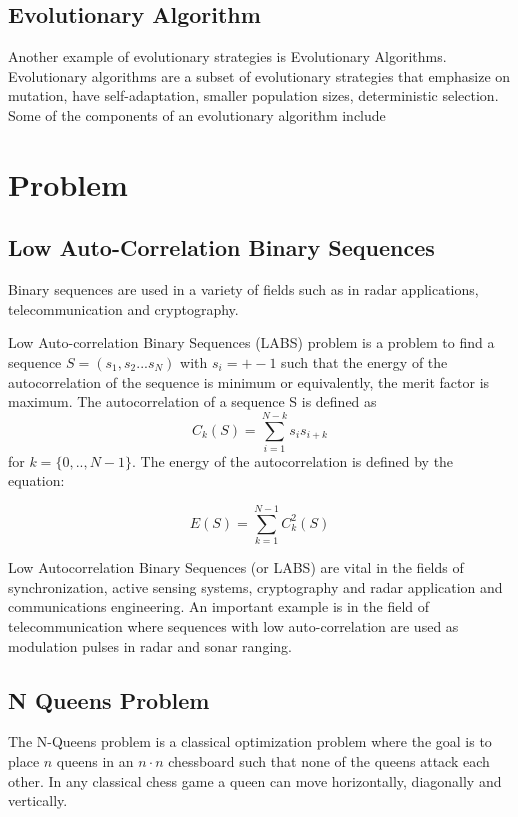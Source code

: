 \documentclass{article}
\begin{document}
\subsection{Evolutionary Algorithm}
Another example of evolutionary strategies is Evolutionary Algorithms. Evolutionary algorithms are a subset of evolutionary strategies that emphasize on mutation, have self-adaptation, smaller population sizes, deterministic selection. \\
Some of the components of an evolutionary algorithm include

\section{Problem}
\subsection{Low Auto-Correlation Binary Sequences}\label{sec:labs}
Binary sequences are used in a variety of fields such as in radar applications, telecommunication and cryptography. 

Low Auto-correlation Binary Sequences (LABS) problem is a problem to find a sequence $S = (s_1, s_2 ... s_N)$ with $ s_i = +-1$ such that the energy of the autocorrelation of the sequence is minimum or equivalently, the merit factor is maximum.  The autocorrelation of a sequence S is defined as 
\begin{equation*}
    C_k(S) = \sum_{i=1}^{N-k}s_is_{i+k}
\end{equation*}
for $k  = \{0,..,N-1\}$. The energy of the autocorrelation is defined by the equation: 

\begin{equation*}
    E(S) = \sum_{k=1}^{N-1}C_k^2(S)
\end{equation*}

Low Autocorrelation Binary Sequences (or LABS) are vital in the fields of  synchronization, active sensing systems, cryptography and radar application and communications engineering. An important example is in the field of telecommunication where sequences with low auto-correlation are used as modulation pulses in radar and sonar ranging. 

\subsection{N Queens Problem}\label{sec:nqueens}
The N-Queens problem is a classical optimization problem where the goal is to place $n$ queens in an $n \cdot n$   chessboard such that none of the queens attack each other. In any classical chess game a queen can move horizontally, diagonally and vertically. 
\end{document}
